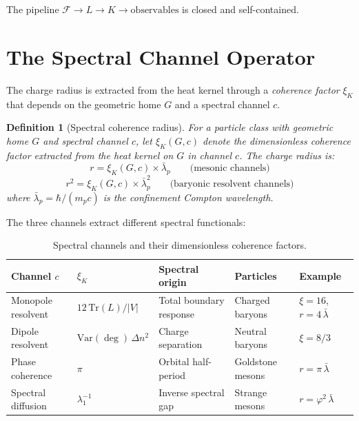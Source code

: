 \documentclass[12pt]{article}
\newtheorem{definition}[theorem]{Definition}
\newcommand{\phig}{\varphi}
\newcommand{\lbar}{\bar{\lambda}}
\newcommand{\Fcal}{\mathcal{F}}
\begin{document}
The pipeline $\Fcal \to L \to K \to \text{observables}$ is closed and self-contained.

\section{The Spectral Channel Operator}\label{sec:channel}

The charge radius is extracted from the heat kernel through a \textit{coherence factor} $\xi_K$ that depends on the geometric home $G$ and a spectral channel $c$.

\begin{definition}[Spectral coherence radius]\label{def:channel}
For a particle class with geometric home $G$ and spectral channel $c$, let $\xi_K(G, c)$ denote the \textit{dimensionless coherence factor} extracted from the heat kernel on $G$ in channel $c$. The charge radius is:
\begin{equation}\label{eq:channel_r}
    r = \xi_K(G, c) \times \lbar_p \qquad\text{(mesonic channels)}
\end{equation}
\begin{equation}\label{eq:channel_r2}
    r^2 = \xi_K(G, c) \times \lbar_p^2 \qquad\text{(baryonic resolvent channels)}
\end{equation}
where $\lbar_p = \hbar/(m_p c)$ is the confinement Compton wavelength.
\end{definition}

The three channels extract different spectral functionals:

\begin{table}[ht]
\centering
\caption{Spectral channels and their dimensionless coherence factors.}
\label{tab:channels}
\begin{tabular}{@{}lllll@{}}
\toprule
Channel $c$ & $\xi_K$ & Spectral origin & Particles & Example \\
\midrule
Monopole resolvent & $12\,\mathrm{Tr}(L)/|V|$ & Total boundary response & Charged baryons & $\xi = 16$, $r = 4\,\lbar$ \\
Dipole resolvent & $\mathrm{Var}(\deg)\,\Delta n^2$ & Charge separation & Neutral baryons & $\xi = 8/3$ \\
Phase coherence & $\pi$ & Orbital half-period & Goldstone mesons & $r = \pi\,\lbar$ \\
Spectral diffusion & $\lambda_1^{-1}$ & Inverse spectral gap & Strange mesons & $r = \phig^2\,\lbar$ \\
\bottomrule
\end{tabular}
\end{table}
\end{document}
